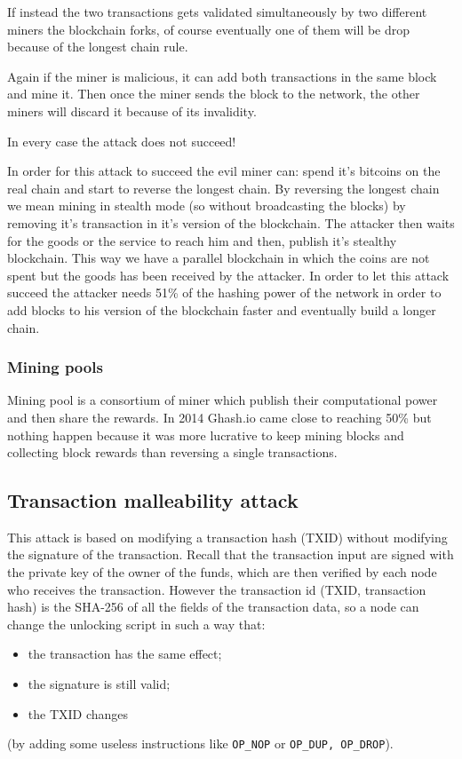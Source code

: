 If instead the two transactions gets validated simultaneously by two different miners the blockchain forks, of course eventually one of them will be drop because of the longest chain rule.

Again if the miner is malicious, it can add both transactions in the same block and mine it.
Then once the miner sends the block to the network, the other miners will discard it because of its invalidity.

In every case the attack does not succeed!

In order for this attack to succeed the evil miner can: spend it's bitcoins on the real chain and start to reverse the longest chain.
By reversing the longest chain we mean mining in stealth mode (so without broadcasting the blocks) by removing it's transaction in it's version of the blockchain.
The attacker then waits for the goods or the service to reach him and then, publish it's stealthy blockchain.
This way we have a parallel blockchain in which the coins are not spent but the goods has been received by the attacker.
In order to let this attack succeed the attacker needs 51\% of the hashing power of the network in order to add blocks to his version of the blockchain faster and eventually build a longer chain.

\subsubsection{Mining pools}
Mining pool is a consortium of miner which publish their computational power and then share the rewards.
In 2014 Ghash.io came close to reaching 50\% but nothing happen because it was more lucrative to keep mining blocks and collecting block rewards than reversing a single transactions.


\subsection{Transaction malleability attack}
This attack is based on modifying a transaction hash (TXID) without modifying the signature of the transaction.
Recall that the transaction input are signed with the private key of the owner of the funds, which are then verified by each node who receives the transaction.
However the transaction id (TXID, transaction hash) is the SHA-256 of all the fields of the transaction data, so a node can change the unlocking script in such a way that:
\begin{itemize}
    \item the transaction has the same effect;
    \item the signature is still valid;
    \item the TXID changes
\end{itemize}
(by adding some useless instructions like \verb|OP_NOP| or \verb|OP_DUP, OP_DROP|).

